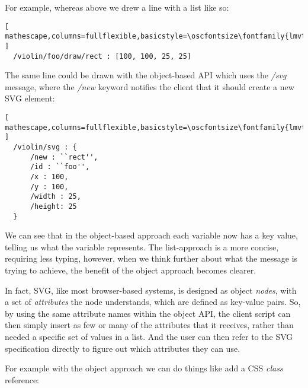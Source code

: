 
For example, whereas above we drew a line with a list like so:
\begin{lstlisting}[ mathescape,columns=fullflexible,basicstyle=\oscfontsize\fontfamily{lmvtt}\selectfont ]
  /violin/foo/draw/rect : [100, 100, 25, 25]
\end{lstlisting}

\noindent
The same line could be drawn with the object-based API which uses the \textit{/svg} message, where the \textit{/new} keyword notifies the client that it should create a new SVG element:

\begin{minipage}{\linewidth}
\begin{lstlisting}[ mathescape,columns=fullflexible,basicstyle=\oscfontsize\fontfamily{lmvtt}\selectfont ]
  /violin/svg : {
      /new : ``rect'',
      /id : ``foo'',
      /x : 100,
      /y : 100,
      /width : 25,
      /height: 25
  }
\end{lstlisting}
\end{minipage}

\noindent
We can see that in the object-based approach each variable now has a key value, telling us what the variable represents.
The list-approach is a more concise, requiring less typing, however, when we think further about what the message is trying to achieve, the benefit of the object approach becomes clearer.

In fact, SVG, like most browser-based systems, is designed as object \textit{nodes}, with a set of \textit{attributes} the node understands, which are defined as key-value pairs.
So, by using the same attribute names within the \drawsocket object API, the client script can then simply insert as few or many of the attributes that it receives, rather than needed a specific set of values in a list.
And the user can then refer to the SVG specification directly to figure out which attributes they can use.

For example with the object approach we can do things like add a CSS \textit{class} reference:

